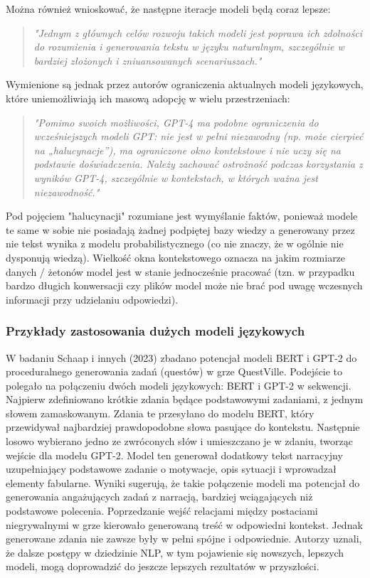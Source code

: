 Można również wnioskować, że następne iteracje modeli będą coraz lepsze:

\begin{quote}
    \textit{"Jednym z głównych celów rozwoju takich modeli jest poprawa ich zdolności do rozumienia i
        generowania tekstu w języku naturalnym, szczególnie w bardziej złożonych i zniuansowanych
        scenariuszach."}\cite{openai2024gpt4}
\end{quote}

Wymienione są jednak przez autorów ograniczenia aktualnych modeli językowych, które uniemożliwiają ich
masową adopcję w wielu przestrzeniach:

\begin{quote}
    \textit{"Pomimo swoich możliwości, GPT-4 ma podobne ograniczenia do wcześniejszych modeli GPT: nie jest w
        pełni niezawodny (np. może cierpieć na „halucynacje”), ma ograniczone okno kontekstowe i nie uczy
        się na podstawie doświadczenia. Należy zachować ostrożność podczas korzystania z wyników GPT-4,
        szczególnie w kontekstach, w których ważna jest niezawodność."}\cite{openai2024gpt4}
\end{quote}

Pod pojęciem "halucynacji" rozumiane jest wymyślanie faktów, ponieważ modele te same w sobie nie posiadają
żadnej podpiętej bazy wiedzy a generowany przez nie tekst wynika z modelu probabilistycznego (co nie
znaczy, że w ogólnie nie dysponują wiedzą). Wielkość okna kontekstowego oznacza na jakim rozmiarze
danych / żetonów model jest w stanie jednocześnie pracować (tzn. w przypadku bardzo długich konwersacji
czy plików model może nie brać pod uwagę wczesnych informacji przy udzielaniu odpowiedzi).

\subsubsection*{Przykłady zastosowania dużych modeli językowych}

W badaniu Schaap i innych (2023)\cite{questville} zbadano potencjał modeli BERT i GPT-2
do proceduralnego generowania zadań (questów) w grze QuestVille. Podejście
to polegało na połączeniu dwóch modeli językowych: BERT i GPT-2 w sekwencji. Najpierw zdefiniowano krótkie
zdania będące podstawowymi zadaniami, z jednym słowem zamaskowanym. Zdania te przesyłano do modelu
BERT, który przewidywał najbardziej prawdopodobne słowa pasujące do kontekstu. Następnie losowo wybierano
jedno ze zwróconych słów i umieszczano je w zdaniu, tworząc wejście dla modelu GPT-2. Model ten generował
dodatkowy tekst narracyjny uzupełniający podstawowe zadanie o motywacje, opis sytuacji i wprowadzał
elementy fabularne. Wyniki sugerują, że takie połączenie modeli ma potencjał do generowania angażujących
zadań z narracją, bardziej wciągających niż podstawowe polecenia. Poprzedzanie wejść relacjami
między postaciami niegrywalnymi w grze kierowało generowaną treść w odpowiedni kontekst. Jednak
generowane zdania nie zawsze były w pełni spójne i odpowiednie. Autorzy uznali, że dalsze postępy w
dziedzinie NLP, w tym pojawienie się nowszych, lepszych modeli, mogą doprowadzić do jeszcze lepszych
rezultatów w przyszłości.\cite{questville}

